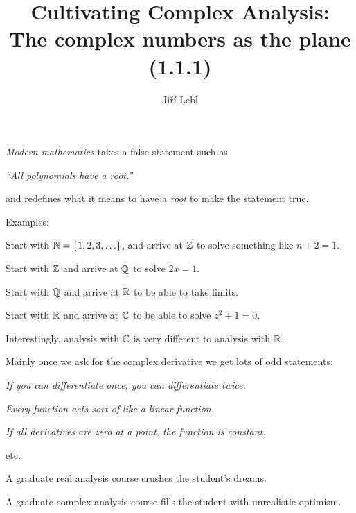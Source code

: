 \documentclass[10pt,aspectratio=169]{beamer}
\author{Ji\v{r}\'i Lebl}
\institute[OSU]{%
Departemento pri Matematiko de Oklahoma {\^S}tata Universitato}
\title{Cultivating Complex Analysis:\\%
The complex numbers as the plane (1.1.1)}
\date{}
\begin{document}
\begin{frame}
\titlepage
\end{frame}

\begin{frame}
\emph{Modern mathematics} takes a false statement such as

\medskip

\emph{``All polynomials have a root.''}

\medskip
\pause

and redefines what it means to have a \emph{root}
to make the statement true.

\medskip
\pause

Examples:

Start with ${\mathbb{N}} = \{ 1,2,3,\ldots \}$,
and arrive at ${\mathbb{Z}}$ to solve something like $n+2=1$.

\medskip
\pause

Start with ${\mathbb{Z}}$ and arrive at ${\mathbb{Q}}$ to solve
$2x=1$.

\medskip
\pause

Start with ${\mathbb{Q}}$ and arrive at ${\mathbb{R}}$ to be able to take limits.

\medskip
\pause

Start with ${\mathbb{R}}$ and arrive at ${\mathbb{C}}$ to be able to solve $z^2+1=0$.
\end{frame}

\begin{frame}
Interestingly, analysis with ${\mathbb{C}}$ is very different to analysis with ${\mathbb{R}}$.

\medskip
\pause

Mainly once we ask for the complex derivative we get lots of odd statements:

\medskip

\emph{If you can differentiate once, you can differentiate twice.}

\pause
\emph{Every function acts sort of like a linear function.}

\pause
\emph{If all derivatives are zero at a point, the function is constant.}

\pause
etc.

\medskip
\pause

A graduate real analysis course crushes the student's dreams.

\medskip
\pause

A graduate complex analysis course fills the student with unrealistic
optimism.

\end{frame}
\end{document}
